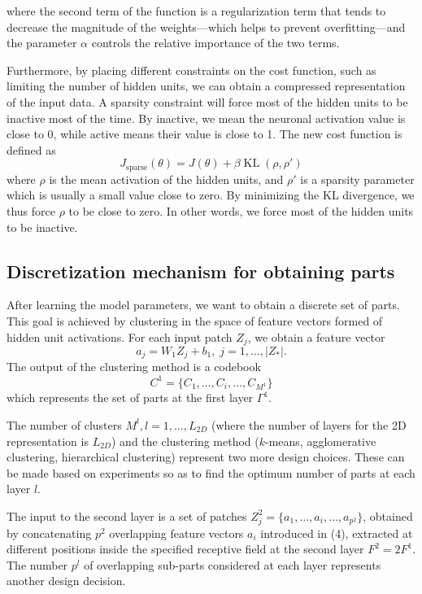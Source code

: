 \documentclass[runningheads]{llncs}
\newcommand{\KL}{\mathop{\textrm{KL}}}
\begin{document}
where the second term of the function is a regularization term that tends to decrease the magnitude of the weights---which helps to prevent overfitting---and the parameter $\alpha$ controls the relative importance of the two terms.
 
Furthermore, by placing different constraints on the cost function, such as limiting the number of hidden units, we can obtain a compressed representation of the input data. A sparsity constraint will force most of the hidden units to be inactive most of the time. By inactive, we mean the neuronal activation value is close to 0, while active means their value is close to 1. The new cost function is defined as
\begin{equation}
J_{\textrm{sparse}}(\theta)=J(\theta)+\beta \KL(\rho,\rho')
\end{equation}
where $\rho$ is the mean activation of the hidden units, and $\rho'$ is a sparsity parameter which is usually a small value close to zero. By minimizing the KL divergence, we thus force $\rho$ to be close to zero. In other words, we force most of the hidden units to be inactive.

\subsection{Discretization mechanism for obtaining parts} 

After learning the model parameters, we want to obtain a discrete set of parts. This goal is achieved by clustering in the space of feature vectors formed of hidden unit activations. For each input patch $Z_j$, we obtain a feature vector
\begin{equation}
a_j=W_1Z_j+b_1, \;j=1,\ldots,|Z_*|.
\end{equation}
The output of the clustering method is a codebook
\begin{equation}
C^1=\{C_1,\ldots,C_i,\ldots,C_{M^1}\}
\end{equation}
which represents the set of parts at the first layer $\Gamma^{1}$. 

The number of clusters $M^l, l=1,\ldots,L_{2D}$ (where the number of layers for the 2D representation is $L_{2D}$) and the clustering method ($k$-means, agglomerative clustering, hierarchical clustering) represent two more design choices. These can be made based on experiments so as to find the optimum number of parts at each layer $l$. 

The input to the second layer is a set of patches $Z_j^2=\{a_1,\ldots,a_i,\ldots,a_{p^2}\}$, obtained by concatenating  $p^2$ overlapping feature vectors $a_i$ introduced in (4), extracted at different positions inside the specified receptive field at the second layer $F^2=2F^1$. The number $p^l$ of overlapping sub-parts considered at each layer represents another design decision.
\end{document}
